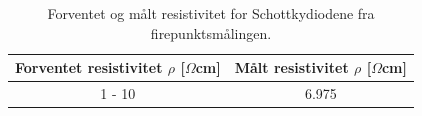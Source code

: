 \documentclass{article}
\begin{document}
    \begin{table}[ht]
        \centering
        \caption{Forventet og målt resistivitet for Schottkydiodene fra firepunktsmålingen.}
        \vspace{2mm}
        \label{tab:schottkyresistivitet}
        \begin{tabular}{|c|c|}
            \hline
            Forventet resistivitet $\rho$ [$\Omega$cm] & Målt resistivitet $\rho$ [$\Omega$cm]  \\
            \hline \hline
            1 - 10 & 6.975 \\
            \hline
        \end{tabular} \\
        \hspace{0pt}\\
    \end{table}
    \fi



\end{document}

